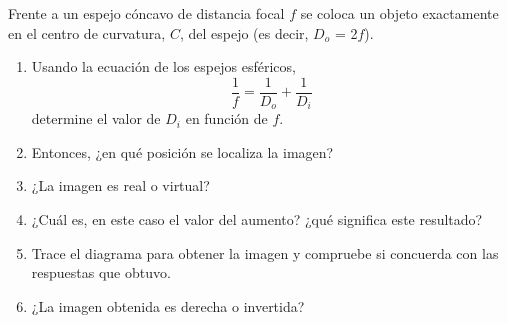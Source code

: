 Frente a un espejo cóncavo de distancia focal $f$ se coloca un objeto exactamente en el centro de curvatura, $C$, del espejo (es decir, $D_o$ = 2$f$).
\begin{enumerate}
    \item Usando la ecuación de los espejos esféricos, 
    \begin{equation*}
        \frac{1}{f} = \frac{1}{D_o} + \frac{1}{D_i}
    \end{equation*}
    determine el valor de $D_i$ en función de $f$.
    \item Entonces, ¿en qué posición se localiza la imagen?
    \item ¿La imagen es real o virtual?
    \item ¿Cuál es, en este caso el valor del aumento? ¿qué significa este resultado?
    \item Trace el diagrama para obtener la imagen y compruebe si concuerda con las respuestas que obtuvo.
    \item ¿La imagen obtenida es derecha o invertida?
\end{enumerate}